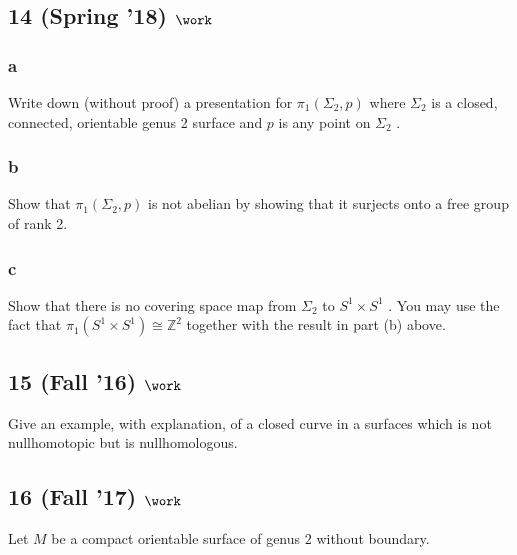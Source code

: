 \hypertarget{spring-18-work-2}{%
\subsection{\texorpdfstring{14 (Spring '18)
\(\work\)}{14 (Spring '18) \textbackslash work}}\label{spring-18-work-2}}

\hypertarget{a-4}{%
\subsubsection{a}\label{a-4}}

Write down (without proof) a presentation for \(\pi_1 (\Sigma_2 , p)\)
where \(\Sigma_2\) is a closed, connected, orientable genus 2 surface
and \(p\) is any point on \(\Sigma_2\) .

\hypertarget{b-4}{%
\subsubsection{b}\label{b-4}}

Show that \(\pi_1 (\Sigma_2 , p)\) is not abelian by showing that it
surjects onto a free group of rank 2.

\hypertarget{c-1}{%
\subsubsection{c}\label{c-1}}

Show that there is no covering space map from \(\Sigma_2\) to
\(S^1 \times S^1\) . You may use the fact that
\(\pi_1 (S^1 \times S^1 ) \cong {\mathbb{Z}}^2\) together with the
result in part (b) above.

\hypertarget{fall-16-work-6}{%
\subsection{\texorpdfstring{15 (Fall '16)
\(\work\)}{15 (Fall '16) \textbackslash work}}\label{fall-16-work-6}}

Give an example, with explanation, of a closed curve in a surfaces which
is not nullhomotopic but is nullhomologous.

\hypertarget{fall-17-work-4}{%
\subsection{\texorpdfstring{16 (Fall '17)
\(\work\)}{16 (Fall '17) \textbackslash work}}\label{fall-17-work-4}}

Let \(M\) be a compact orientable surface of genus \(2\) without
boundary.


